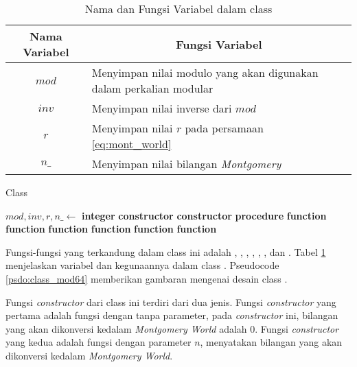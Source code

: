 \begin{table}[]
	\Centering
	\begin{tabular}{|c|p{7cm}|}
	\hline
	Nama Variabel & \multicolumn{1}{c|}{Fungsi Variabel}                               \\ \hline
$mod$           & Menyimpan nilai modulo yang akan digunakan dalam perkalian modular \\ \hline
$inv$           & Menyimpan nilai inverse dari $ mod $          \\ \hline
$r$             & Menyimpan nilai $r$ pada persamaan \eqref{eq:mont_world} \\ \hline
$n\_$           & Menyimpan nilai bilangan \textit{Montgomery}   \\ \hline
	\end{tabular}
	\caption{Nama dan Fungsi Variabel dalam class }
	\label{tab:var_mod64}
\end{table}

\begin{algorithm}
	\caption{Class }
	\label{psdo:class_mod64}
	\begin{algorithmic}[1]
		\State $ mod, inv, r, n\_ \leftarrow $ \textbf{integer}
		\State \textbf{constructor} 
		\State \textbf{constructor} 
		\State \textbf{procedure} 
		\State \textbf{function} 
		\State \textbf{function} 
		\State \textbf{function} 
		\State \textbf{function} 
		\State \textbf{function} 
		\State \textbf{function} 
	\end{algorithmic}
\end{algorithm}

Fungsi-fungsi yang terkandung dalam class ini adalah , , , , , , dan . Tabel \ref{tab:var_mod64} menjelaskan variabel dan kegunaannya dalam class .  Pseudocode \ref{psdo:class_mod64} memberikan gambaran mengenai desain class . 

Fungsi \textit{constructor} dari class ini terdiri dari dua jenis. Fungsi \textit{constructor} yang pertama adalah fungsi dengan tanpa parameter, pada \textit{constructor} ini, bilangan yang akan dikonversi kedalam \textit{Montgomery World} adalah $ 0 $. Fungsi \textit{constructor} yang kedua adalah fungsi dengan parameter $ n $, menyatakan bilangan yang akan dikonversi kedalam \textit{Montgomery World}.

